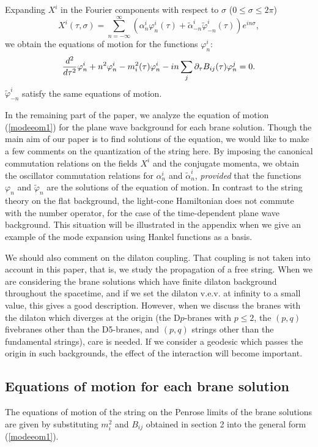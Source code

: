 \documentclass[a4paper,12pt]{article}
\begin{document}
Expanding $X^{i}$ in the Fourier components with respect to 
$\sigma$ ($0\le \sigma \le 2\pi$) 
\begin{equation}
X^{i}(\tau,\sigma)=\sum_{n=-\infty}^{\infty}\left(\alpha_{n}^{i}
\varphi^{i}_{n}(\tau)+ \tilde{\alpha}_{-n}^{i}
\tilde{\varphi}^{i}_{-n}(\tau) \right)
e^{in\sigma},
\end{equation}
we obtain the equations of motion for the functions 
$\varphi^{i}_{n}$:
\begin{equation}
{d^2\over d\tau^2}\varphi^{i}_{n}
+n^2\varphi^{i}_{n} -m^{2}_{i}(\tau)\varphi^{i}_{n}
-in\sum_{j}\partial_\tau B_{ij}(\tau)\varphi^{j}_{n} =0.
\label{modeeom1}
\end{equation}
$\tilde{\varphi}^{i}_{-n}$ satisfy the same equations
of motion.

In the remaining part of the paper, 
we analyze the equation of motion 
(\ref{modeeom1}) for the plane wave background for each 
brane solution. Though the main aim of our paper
is to find solutions of the equation, we  
would like to make a few comments on the
quantization of the string here.
By imposing the canonical commutation relations
on the fields $X^i$ and the conjugate momenta, 
we obtain the oscillator commutation relations for 
$\alpha_{n}^{i}$ and $\tilde{\alpha}_{n}^{i}$, 
{\it provided} that the functions
$\varphi_{n}$ and $\tilde{\varphi}_{n}$ are the solutions
of the equation of motion. In contrast to the string theory
on the flat background, the light-cone Hamiltonian
does not commute with the number operator, for the case
of the time-dependent plane wave background.
This situation will be illustrated in the appendix when 
we give an example of the mode expansion
using Hankel functions as a basis.

We should also comment on the dilaton coupling. That
coupling  is not taken into account
in this paper, that is,  we study the propagation of a free
string. When we are considering the brane solutions which
have finite dilaton background throughout the spacetime,
and if we set the dilaton v.e.v. at infinity to 
a small value, this gives a good description.
However, when we discuss the branes with the
dilaton which diverges at the origin (the D$p$-branes with
$p\le 2$, the $(p,q)$ fivebranes other than the D5-branes,
and $(p,q)$ strings other than the fundamental strings),
care is needed.
If we consider a geodesic which passes the origin in 
such backgrounds, the effect of the interaction 
will become important.



\subsection{Equations of motion for each brane solution}
The equations of motion of the string on the Penrose limits
of the brane solutions are given by substituting 
$m^{2}_{i}$ and $B_{ij}$ obtained in section 2 
into the general form (\ref{modeeom1}).
\medskip
\end{document}
